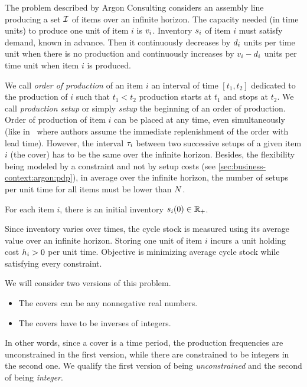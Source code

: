 The problem described by Argon Consulting considers an assembly line producing a set $\mathcal{I}$ of items over an infinite horizon.
The capacity needed (in time units) to produce one unit of item $i$ is $v_i$.
Inventory $s_i$ of item $i$ must satisfy demand, known in advance.
Then it continuously decreases by $d_i$ units per time unit when there is no production and continuously increases by $v_i-d_i$ units per time unit when item $i$ is produced.


We call \emph{order of production} of an item $i$ an interval of time $[t_1,t_2]$ dedicated to the production of $i$ such that $t_1<t_2$ production starts at $t_1$ and stops at $t_2$.
We call \emph{production setup} or simply \emph{setup} the beginning of an order of production.
Order of production of item $i$ can be placed at any time, even simultaneously (like in~\cite{Ohno2001} where authors assume the immediate replenishment of the order with lead time).
However, the interval $\tau_i$ between two successive setups of a given item $i$ (\ie the cover) has to be the same over the infinite horizon.
Besides, the flexibility being modeled by a constraint and not by setup costs (see \cref{sec:business-context:argon:pdp}), in average over the infinite horizon, the number of setups per unit time for all items must be lower than $N$.


For each item $i$, there is an initial inventory $s_i\bracket{0}\in\RR_+$.


Since inventory varies over times, the cycle stock is measured using its average value over an infinite horizon.
Storing one unit of item $i$ incurs a unit holding cost $h_i>0$ per unit time.
Objective is minimizing average cycle stock while satisfying every constraint.


\medskip


We will consider two versions of this problem.
\begin{itemize}
  \item The covers can be any nonnegative real numbers.
  \item The covers have to be inverses of integers.
\end{itemize}
In other words, since a cover is a time period, the production frequencies are unconstrained in the first version, while there are constrained to be integers in the second one. We qualify the first version of being {\em unconstrained} and the second of being {\em integer}.




